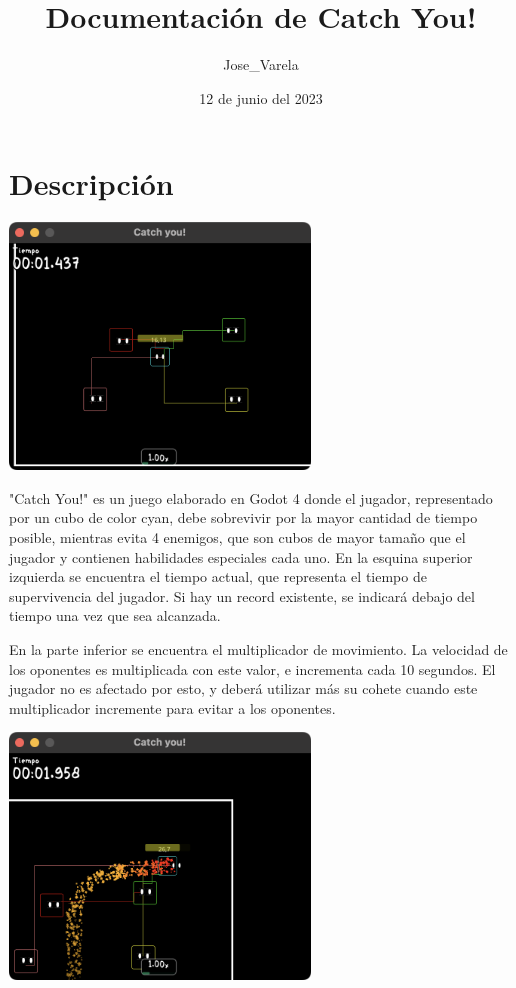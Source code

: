 \documentclass{article}
\title{Documentación de Catch You!}
\author{Jose_Varela}
\date{12 de junio del 2023}
\begin{document}
\maketitle
\tableofcontents
\thispagestyle{empty}
\newpage
\setcounter{page}{1}

\section{Descripción}

\begin{center}
    \includegraphics[width = 80mm]{_capt-juego.png}
\end{center}

"Catch You!" es un juego elaborado en Godot 4 donde el jugador, representado por un cubo de color cyan,
debe sobrevivir por la mayor cantidad de tiempo posible, mientras evita 4 enemigos, que son cubos de mayor tamaño que el jugador
y contienen habilidades especiales cada uno. En la esquina superior izquierda se encuentra el tiempo actual,
que representa el tiempo de supervivencia del jugador. Si hay un record existente, se indicará debajo del tiempo una vez que sea alcanzada.

En la parte inferior se encuentra el multiplicador de movimiento. La velocidad de los oponentes es multiplicada con este valor, e incrementa cada 10 segundos.
El jugador no es afectado por esto, y deberá utilizar más su cohete cuando este multiplicador incremente para evitar a los oponentes.

\begin{center}
    \includegraphics[width = 80mm]{_capt-cohete.png}
\end{center}
\end{document}

